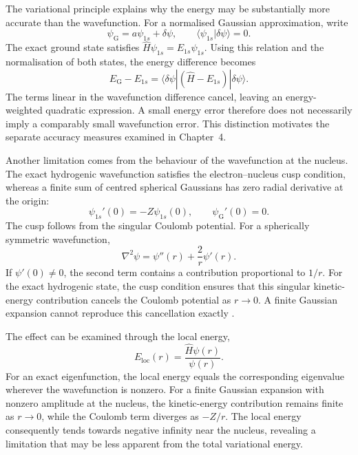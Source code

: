 The variational principle explains
why the energy may be substantially
more accurate than the wavefunction.
For a normalised Gaussian approximation,
write
\[
    \psi_{\mathrm G}
    =a\psi_{1s}+\delta\psi,
    \qquad
    \langle\psi_{1s}|\delta\psi\rangle=0.
\]
The exact ground state satisfies
$\hat H\psi_{1s}=E_{1s}\psi_{1s}$.
Using this relation and the
normalisation of both states,
the energy difference becomes
\begin{equation}
    E_{\mathrm G}-E_{1s}
    =\langle\delta\psi|
      (\hat H-E_{1s})|\delta\psi\rangle.
    \label{eq:variational_error}
\end{equation}
The terms linear in the wavefunction
difference cancel, leaving an
energy-weighted quadratic expression.
A small energy error therefore does
not necessarily imply a comparably
small wavefunction error. This
distinction motivates the separate
accuracy measures examined in
Chapter~4.

Another limitation comes from the
behaviour of the wavefunction at
the nucleus. The exact hydrogenic
wavefunction satisfies the
electron--nucleus cusp condition,
whereas a finite sum of centred
spherical Gaussians has zero radial
derivative at the origin:
\begin{equation}
    \psi_{1s}'(0)=-Z\psi_{1s}(0),
    \qquad
    \psi_{\mathrm G}'(0)=0.
    \label{eq:cusp_condition}
\end{equation}
The cusp follows from the singular
Coulomb potential. For a spherically
symmetric wavefunction,
\[
    \nabla^2\psi
    =\psi''(r)+\frac{2}{r}\psi'(r).
\]
If $\psi'(0)\neq0$, the second term
contains a contribution proportional
to $1/r$. For the exact hydrogenic
state, the cusp condition ensures
that this singular kinetic-energy
contribution cancels the Coulomb
potential as $r\to0$. A finite
Gaussian expansion cannot reproduce
this cancellation exactly
\cite{Kato,Kutzelnigg1994}.

The effect can be examined through
the local energy,
\begin{equation}
    E_{\mathrm{loc}}(r)
    =\frac{\hat H\psi(r)}{\psi(r)}.
    \label{eq:local_energy}
\end{equation}
For an exact eigenfunction, the
local energy equals the corresponding
eigenvalue wherever the wavefunction
is nonzero. For a finite Gaussian
expansion with nonzero amplitude
at the nucleus, the kinetic-energy
contribution remains finite as
$r\to0$, while the Coulomb term
diverges as $-Z/r$. The local
energy consequently tends towards
negative infinity near the nucleus,
revealing a limitation that may
be less apparent from the total
variational energy.

